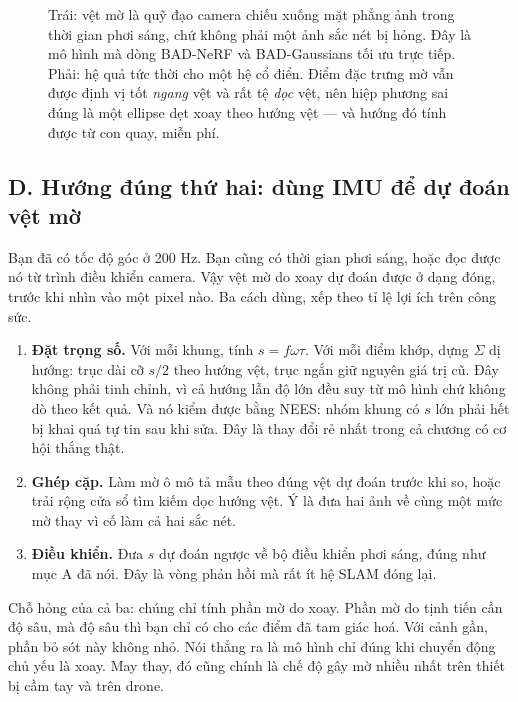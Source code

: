 \documentclass[../../deep_learning.tex]{subfiles}
\begin{document}
\begin{figure}[H]
{}
\caption{Trái: vệt mờ là quỹ đạo camera chiếu xuống mặt phẳng ảnh trong thời gian phơi sáng, chứ không phải một ảnh sắc nét bị hỏng. Đây là mô hình mà dòng BAD-NeRF và BAD-Gaussians tối ưu trực tiếp. Phải: hệ quả tức thời cho một hệ cổ điển. Điểm đặc trưng mờ vẫn được định vị tốt \emph{ngang} vệt và rất tệ \emph{dọc} vệt, nên hiệp phương sai đúng là một ellipse dẹt xoay theo hướng vệt --- và hướng đó tính được từ con quay, miễn phí.}
\label{fig:f34-vet-mo}
\end{figure}

\subsection{D. Hướng đúng thứ hai: dùng IMU để dự đoán vệt mờ}

Bạn đã có tốc độ góc ở 200 Hz. Bạn cũng có thời gian phơi sáng, hoặc đọc được nó từ trình điều khiển camera. Vậy vệt mờ do xoay dự đoán được ở dạng đóng, trước khi nhìn vào một pixel nào. Ba cách dùng, xếp theo tỉ lệ lợi ích trên công sức.

\begin{enumerate}
\item \textbf{Đặt trọng số.} Với mỗi khung, tính \(s = f\omega\tau\). Với mỗi điểm khớp, dựng \(\Sigma\) dị hướng: trục dài cỡ \(s/2\) theo hướng vệt, trục ngắn giữ nguyên giá trị cũ. Đây không phải tinh chỉnh, vì cả hướng lẫn độ lớn đều suy từ mô hình chứ không dò theo kết quả. Và nó kiểm được bằng NEES: nhóm khung có \(s\) lớn phải hết bị khai quá tự tin sau khi sửa. Đây là thay đổi rẻ nhất trong cả chương có cơ hội thắng thật.
\item \textbf{Ghép cặp.} Làm mờ ô mô tả mẫu theo đúng vệt dự đoán trước khi so, hoặc trải rộng cửa sổ tìm kiếm dọc hướng vệt. Ý là đưa hai ảnh về cùng một mức mờ thay vì cố làm cả hai sắc nét.
\item \textbf{Điều khiển.} Đưa \(s\) dự đoán ngược về bộ điều khiển phơi sáng, đúng như mục A đã nói. Đây là vòng phản hồi mà rất ít hệ SLAM đóng lại.
\end{enumerate}

Chỗ hỏng của cả ba: chúng chỉ tính phần mờ do xoay. Phần mờ do tịnh tiến cần độ sâu, mà độ sâu thì bạn chỉ có cho các điểm đã tam giác hoá. Với cảnh gần, phần bỏ sót này không nhỏ. Nói thẳng ra là mô hình chỉ đúng khi chuyển động chủ yếu là xoay. May thay, đó cũng chính là chế độ gây mờ nhiều nhất trên thiết bị cầm tay và trên drone.
\end{document}
